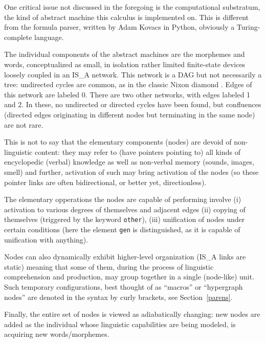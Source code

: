 \documentclass[11pt,bookmarks,bookmarksnumbered,naturalnames,plainpages=false,pdftex,colorlinks=true,urlcolor=blue,bookmarksdepth=subsection,plainpages=false]{paper}
\begin{document}
One critical issue not discussed in the foregoing is the computational
substratum, the kind of abstract machine this calculus is implemented on. This
is different from the formula parser, written by Adam Kovacs in Python,
obviously a Turing-complete language.

The individual components of the abstract machines are the morphemes and words,
conceptualized as small, in isolation rather limited finite-state devices
loosely coupled in an IS\_A network. This network is a DAG but not necessarily a tree: 
undirected cycles are common, as in the classic Nixon diamond
\citep{Reiter:1983}. Edges of this network are labeled 0. There are two other
networks, with edges labeled 1 and 2. In these, no undirected or directed 
cycles have been found, but confluences (directed edges originating in
different nodes but terminating in the same node) are not rare. 

This is not to say that the elementary components (nodes) are devoid of
non-linguistic content: they may refer to (have pointers pointing to) all
kinds of encyclopedic (verbal) knowledge as well as non-verbal memory (sounds,
images, smell) and further, activation of such may bring activation of the
nodes (so these pointer links are often bidirectional, or better yet,
directionless). 

The elementary opperations the nodes are capable of performing involve (i)
activation to various degrees of themselves and adjacent edges (ii) copying of
themselves (triggered by the keyword {\tt other}), (iii) unification of
nodes under certain conditions (here the element {\tt gen} is
distinguished, as it is capable of unification with anything).

Nodes can also dynamically exhibit higher-level organization (IS\_A links are
static) meaning that some of them, during the process of linguistic
comprehension and production, may group together in a single (node-like)
unit. Such temporary configurations, best thought of as ``macros'' or
``hypergraph nodes'' are denoted in the syntax by curly brackets, see
Section~\ref{parens}.

Finally, the entire set of nodes is viewed as adiabatically changing: new
nodes are added as the individual whose linguistic capabilities are being
modeled, is acquiring new words/morphemes. 




\printbibliography
\end{document}
